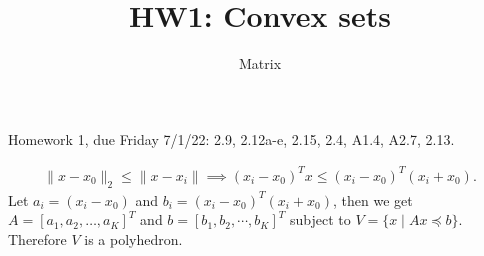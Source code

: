 \documentclass[12pt]{article}
\title{HW1: Convex sets}
\author{Matrix}
\begin{document}
\maketitle

Homework 1, due Friday 7/1/22:  2.9, 2.12a-e, 2.15, 2.4, A1.4, A2.7, 2.13.

\begin{solution}[2.9(a)]
    \begin{align*}
        \|x-x_0\|_2\le \|x-x_i\| \implies (x_i-x_0)^Tx \le (x_i-x_0)^T(x_i+x_0).
    \end{align*}
    Let $a_i=(x_i-x_0)$ and $b_i=(x_i-x_0)^T(x_i+x_0)$, then we get $A=[a_1, a_2, \ldots, a_K]^T$ and $b=[b_1, b_2, \cdots, b_K]^T$ subject to $V=\{ x \mid Ax \preceq b\}$. Therefore $V$ is a polyhedron.
\end{solution}
\end{document}
